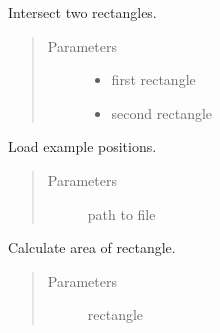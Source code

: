 \documentclass[letterpaper,10pt,english]{sphinxmanual}
\begin{document}
\begin{fulllineitems}
\label{\detokenize{api:find_logos.intersect}}
Intersect two rectangles.
\begin{quote}\begin{description}
\item[{Parameters}] \leavevmode\begin{itemize}
\item {} 
 \textendash{} first rectangle

\item {} 
 \textendash{} second rectangle

\end{itemize}

\end{description}\end{quote}

\end{fulllineitems}


\begin{fulllineitems}
\label{\detokenize{api:find_logos.load_positions}}
Load example positions.
\begin{quote}\begin{description}
\item[{Parameters}] \leavevmode
{} \textendash{} path to file

\end{description}\end{quote}

\end{fulllineitems}

\label{\detokenize{api:module-color_filter2}}

\begin{fulllineitems}
\label{\detokenize{api:color_filter2.area}}
Calculate area of rectangle.
\begin{quote}\begin{description}
\item[{Parameters}] \leavevmode
{} \textendash{} rectangle

\end{description}\end{quote}

\end{fulllineitems}
\end{document}
